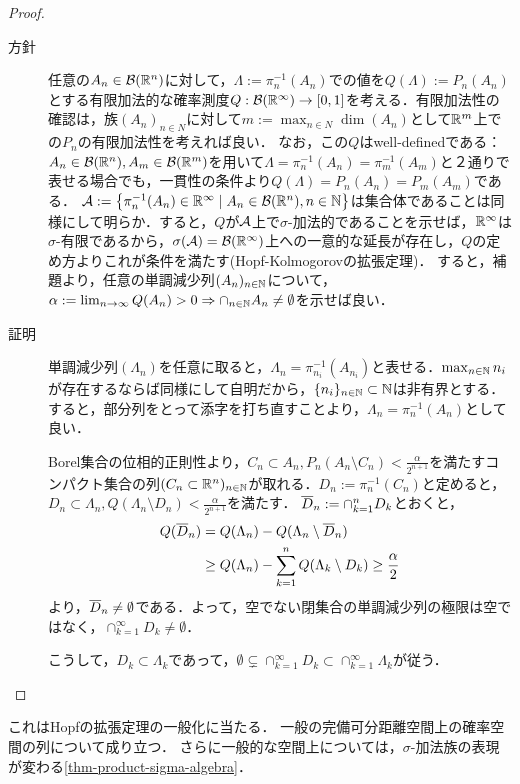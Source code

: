 \documentclass[uplatex,dvipdfmx]{jsreport}
\begin{document}
\begin{proof}\mbox{}
    \begin{description}
        \item[方針] 任意の$A_n\in\mathcal{B}(\mathbb{R}^n)$に対して，$\Lambda:=\pi^{-1}_n(A_n)$での値を$Q(\Lambda):=P_n(A_n)$とする有限加法的な確率測度$Q:\mathcal{B}(\mathbb{R}^\infty)\to[0,1]$を考える．有限加法性の確認は，族$(A_n)_{n\in N}$に対して$m:=\max_{n\in N}\dim(A_n)$として$\mathbb{R}^m$上での$P_n$の有限加法性を考えれば良い．
        なお，この$Q$はwell-definedである：$A_n\in\mathcal{B}(\mathbb{R}^n),A_m\in\mathcal{B}(\mathbb{R}^m)$を用いて$\Lambda=\pi^{-1}_n(A_n)=\pi^{-1}_m(A_m)$と２通りで表せる場合でも，一貫性の条件より$Q(\Lambda)=P_n(A_n)=P_m(A_m)$である．
        $\mathcal{A}:=\left\{\pi^{-1}_n(A_n)\in\mathbb{R}^\infty\mid A_n\in\mathcal{B}(\mathbb{R}^n),n\in\mathbb{N}\right\}$は集合体であることは同様にして明らか．すると，$Q$が$\mathcal{A}$上で$\sigma$-加法的であることを示せば，$\mathbb{R}^\infty$は$\sigma$-有限であるから，$\sigma(\mathcal{A})=\mathcal{B}(\mathbb{R}^\infty)$上への一意的な延長が存在し，$Q$の定め方よりこれが条件を満たす(Hopf-Kolmogorovの拡張定理)．
        すると，補題より，任意の単調減少列$(A_n)_{n\in\mathbb{N}}$について，$\alpha:=\lim_{n\to\infty}Q(A_n)>0\Rightarrow\cap_{n\in\mathbb{N}}A_n\ne\emptyset$を示せば良い．
        \item[証明]
        単調減少列$(\Lambda_n)$を任意に取ると，$\Lambda_n=\pi^{-1}_{n_i}(A_{n_i})$と表せる．$\max_{n\in\mathbb{N}}n_i$が存在するならば同様にして自明だから，$\{n_i\}_{n\in\mathbb{N}}\subset\mathbb{N}$は非有界とする．すると，部分列をとって添字を打ち直すことより，$\Lambda_n=\pi^{-1}_n(A_n)$として良い．

        Borel集合の位相的正則性より，$C_n\subset A_n,P_n(A_n\setminus C_n)<\frac{\alpha}{2^{n+1}}$を満たすコンパクト集合の列$(C_n\subset\mathbb{R}^n)_{n\in\mathbb{N}}$が取れる．$D_n:=\pi^{-1}_n(C_n)$と定めると，$D_n\subset\Lambda_n,Q(\Lambda_n\setminus D_n)<\frac{\alpha}{2^{n+1}}$を満たす．
        $\overline{D}_n:=\cap_{k=1}^nD_k$とおくと，
        \begin{align*}
            Q(\overline{D}_n)&=Q(\Lambda_n)-Q(\Lambda_n\setminus\overline{D}_n)\\
            &\ge Q(\Lambda_n)-\sum^n_{k=1}Q(\Lambda_k\setminus D_k)\ge\frac{\alpha}{2}
        \end{align*}
        より，$\overline{D}_n\ne\emptyset$である．よって，空でない閉集合の単調減少列の極限は空ではなく，$\cap^\infty_{k=1}D_k\ne\emptyset$．

        こうして，$D_k\subset\Lambda_k$であって，$\emptyset\subsetneq\cap^\infty_{k=1}D_k\subset\cap^\infty_{k=1}\Lambda_k$が従う．
    \end{description}
\end{proof}
\begin{remark}
    これはHopfの拡張定理の一般化に当たる．
    一般の完備可分距離空間上の確率空間の列について成り立つ．
    さらに一般的な空間上については，$\sigma$-加法族の表現が変わる\ref{thm-product-sigma-algebra}．
\end{remark}
\end{document}
